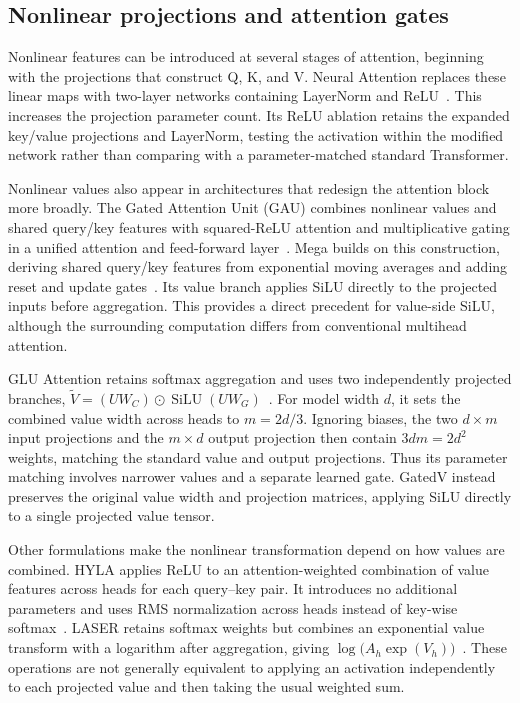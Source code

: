 \documentclass[11pt,a4paper]{article}
\newcommand{\silu}{\operatorname{SiLU}}
\begin{document}
\subsection{Nonlinear projections and attention gates}
\label{sec:related}
Nonlinear features can be introduced at several stages of attention, beginning with the projections that construct Q, K, and V. Neural Attention replaces these linear maps with two-layer networks containing LayerNorm and ReLU~\citep{neuralattention}. This increases the projection parameter count. Its ReLU ablation retains the expanded key/value projections and LayerNorm, testing the activation within the modified network rather than comparing with a parameter-matched standard Transformer.

Nonlinear values also appear in architectures that redesign the attention block more broadly. The Gated Attention Unit (GAU) combines nonlinear values and shared query/key features with squared-ReLU attention and multiplicative gating in a unified attention and feed-forward layer~\citep{gau}. Mega builds on this construction, deriving shared query/key features from exponential moving averages and adding reset and update gates~\citep{mega}. Its value branch applies SiLU directly to the projected inputs before aggregation. This provides a direct precedent for value-side SiLU, although the surrounding computation differs from conventional multihead attention.

GLU Attention retains softmax aggregation and uses two independently projected branches, $\widetilde V=(UW_C)\odot\silu(UW_G)$~\citep{gluattention}. For model width $d$, it sets the combined value width across heads to $m=2d/3$. Ignoring biases, the two $d\times m$ input projections and the $m\times d$ output projection then contain $3dm=2d^2$ weights, matching the standard value and output projections. Thus its parameter matching involves narrower values and a separate learned gate. GatedV instead preserves the original value width and projection matrices, applying SiLU directly to a single projected value tensor.

Other formulations make the nonlinear transformation depend on how values are combined. HYLA applies ReLU to an attention-weighted combination of value features across heads for each query--key pair. It introduces no additional parameters and uses RMS normalization across heads instead of key-wise softmax~\citep{hypernetwork}. LASER retains softmax weights but combines an exponential value transform with a logarithm after aggregation, giving $\log\!\big(A_h\exp(V_h)\big)$~\citep{laser}. These operations are not generally equivalent to applying an activation independently to each projected value and then taking the usual weighted sum.
\end{document}
